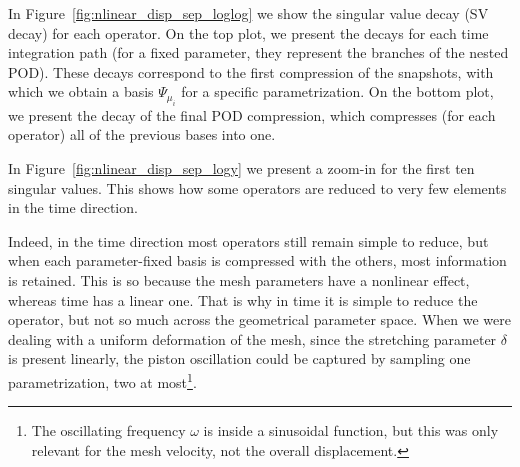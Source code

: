 \documentclass[../../thesis.tex]{subfiles}
\begin{document}
In Figure~\ref{fig:nlinear_disp_sep_loglog} we show 
the singular value decay (SV decay) for each operator.
On the top plot, we present the decays for each time integration path 
(for a fixed parameter, they represent the branches of the nested POD).
These decays correspond to the first compression of the snapshots, 
with which we obtain a basis $\Psi_{\mu_i}$ for a specific parametrization.
On the bottom plot, we present the decay of the final POD compression, 
which compresses (for each operator) all of the previous bases into one.

In Figure~\ref{fig:nlinear_disp_sep_logy} we present 
a zoom-in for the first ten singular values.
This shows how some operators are reduced 
to very few elements in the time direction.

Indeed, in the time direction most operators still remain simple to reduce, 
but when each parameter-fixed basis is compressed with the others,
most information is retained.
This is so because the mesh parameters have a nonlinear effect, 
whereas time has a linear one.
That is why in time it is simple to reduce the operator,
but not so much across the geometrical parameter space.
When we were dealing with a uniform deformation of the mesh,
since the stretching parameter $\delta$ is present linearly,
the piston oscillation could be captured by sampling one parametrization,
two at most\footnote{The oscillating frequency $\omega$ is inside a sinusoidal function,
but this was only relevant for the mesh velocity, 
not the overall displacement.}.
\end{document}
